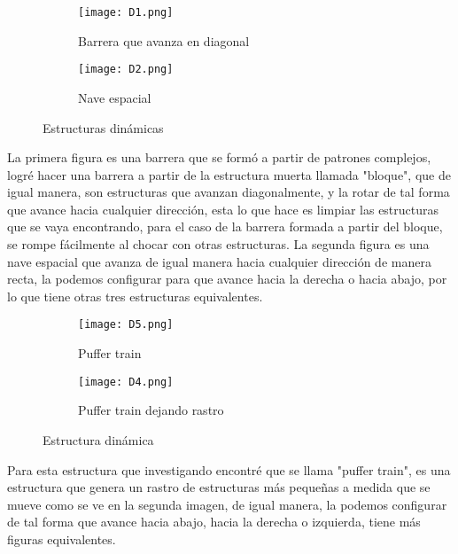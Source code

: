 \documentclass{article}
\begin{document}
\begin{itemize}
 	 \begin{figure}[htbp]
 	 	\centering
 	 	\begin{subfigure}{0.48\textwidth}
 	 		\centering
 	 		\texttt{[image: D1.png]}
 	 		\caption{Barrera que avanza en diagonal}
 	 		\label{fig:D1}
 	 	\end{subfigure}
 	 	\hfill
 	 	\begin{subfigure}{0.48\textwidth}
 	 		\centering
 	 		\texttt{[image: D2.png]}
 	 		\caption{Nave espacial}
 	 		\label{fig:D2}
 	 	\end{subfigure}
 	 	\caption{Estructuras dinámicas}
 	 	\label{fig:A77}
 	 \end{figure}
 	 
 	 La primera figura es una barrera que se formó a partir de patrones complejos, logré hacer una barrera a partir de la estructura muerta llamada "bloque", que de igual manera, son estructuras que avanzan diagonalmente, y la rotar de tal forma que avance hacia cualquier dirección, esta lo que hace es limpiar las estructuras que se vaya encontrando, para el caso de la barrera formada a partir del bloque, se rompe fácilmente al chocar con otras estructuras. La segunda figura es una nave espacial que avanza de igual manera hacia cualquier dirección de manera recta, la podemos configurar para que avance hacia la derecha o hacia abajo, por lo que tiene otras tres estructuras equivalentes. 
 	 	
 		 \begin{figure}[htbp]
	 		\centering
	 		\begin{subfigure}{0.48\textwidth}
	 			\centering
	 			\texttt{[image: D5.png]}
	 			\caption{Puffer train}
	 			\label{fig:D1}
	 		\end{subfigure}
	 		\hfill
	 		\begin{subfigure}{0.48\textwidth}
	 			\centering
	 			\texttt{[image: D4.png]}
	 			\caption{Puffer train dejando rastro}
	 			\label{fig:D2}
	 		\end{subfigure}
	 		\caption{Estructura dinámica}
	 		\label{fig:A77}
	 	\end{figure}
	 	
	 Para esta estructura que investigando encontré que se llama "puffer train", es una estructura que genera un rastro de estructuras más pequeñas a medida que se mueve como se ve en la segunda imagen, de igual manera, la podemos configurar de tal forma que avance hacia abajo, hacia la derecha o izquierda, tiene más figuras equivalentes.
 	 

\end{itemize}
\end{document}
